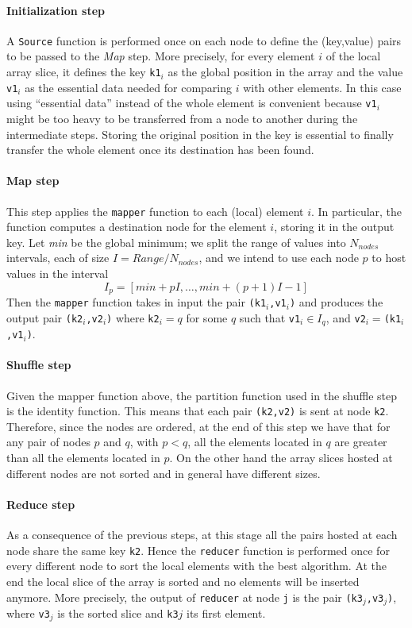 \documentclass[a4paper]{article}
\numberwithin{equation}{section}
\begin{document}
\paragraph{Initialization step}
A \verb+Source+ function is performed once on each node to define the
(key,value) pairs to be passed to the \emph{Map} step. 
More precisely, for every element $i$ of the local array slice, it defines the key \verb+k1+$_i$ as the 
global position 
in the array and the value \verb+v1+$_i$ as the essential data needed
for comparing $i$ with other elements. 
In this case using ``essential data'' instead of the whole
element is convenient because \verb+v1+$_i$ might be too heavy to
be transferred from a node to another during the intermediate steps. 
Storing the original position in the key is essential to finally
transfer the whole element once its destination has been found.  

\paragraph{Map step}
This step applies the \verb+mapper+ function to each (local) element
$i$. In particular, the function computes a destination node for the
element $i$, storing it in the output key.
Let {\it min} be the global minimum; we split the range of values
into $N_{\mathit{nodes}}$ intervals, each of size
$I=\mathit{Range}/N_\mathit{nodes}$, 
and we intend to use each node $p$ to host values in the interval 
$$
I_p = [\mathit{min}+pI,\dots, \mathit{min}+(p+1)I-1]
$$
Then the \verb+mapper+ function takes in input the pair 
\verb+(k1+$_i$\verb+,v1+$_i$\verb+)+ and produces the output pair
\verb+(k2+$_i$\verb+,v2+$_i$\verb+)+ where
\verb+k2+$_i=q$ for some $q$ such that 
\verb+v1+$_i \in I_q$, and
\verb+v2+$_i=$\verb+(k1+$_i$\verb+,v1+$_i$\verb+)+.  
\paragraph{Shuffle step}
Given the mapper function above, the partition function used in the
shuffle step is the identity function. This means that each pair
\verb+(k2+\verb+,v2)+ is sent at node \verb+k2+.
Therefore, since the nodes are
ordered, at the end of this step we have that for any pair
of nodes $p$ and $q$, with $p < q$, all the elements located in $q$
are greater than all the elements located in $p$. On the other hand
the array slices hosted at different nodes are not sorted
and in general have different sizes. 

\paragraph{Reduce step}
As a consequence of the previous steps, at this stage all the pairs
hosted at each node share the same key \verb+k2+.
Hence the \verb+reducer+ function is performed once for every
different node to sort the local elements with the best algorithm.
At the end the local slice of the array is sorted and no 
elements will be inserted anymore. More precisely, the output of
\verb+reducer+ 
at node \verb+j+ is the pair \verb+(k3+$_j$\verb+,v3+$_j$\verb+)+,
where \verb+v3+$_j$ is the sorted slice and \verb+k3+$j$ its first
element.  
\end{document}

